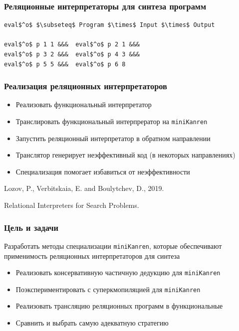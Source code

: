 \documentclass{beamer}
\newcommand{\miniKanren}{\texttt{miniKanren}}
\begin{document}
\begin{frame}[fragile]
  \frametitle{Реляционные интерпретаторы для синтеза программ}

  \begin{center}
    \begin{minipage}{6.2cm}
    \begin{lstlisting}[frame=single]
eval$^o$ $\subseteq$ Program $\times$ Input $\times$ Output

eval$^o$ p 1 1 &&&  eval$^o$ p 2 1 &&&
eval$^o$ p 3 2 &&&  eval$^o$ p 4 3 &&&
eval$^o$ p 5 5 &&&  eval$^o$ p 6 8
    \end{lstlisting}
    \end{minipage}
    \end{center}
\end{frame}


\begin{frame}[fragile]
  \frametitle{Реализация реляционных
  интерпретаторов}
  \begin{itemize}
    \item Реализовать функциональный интерпретатор
    \item Транслировать функциональный интерпрератор на \miniKanren
    \item Запустить реляционный интерпретатор в обратном направлении
  \end{itemize}

  \vfill

  \begin{itemize}
    \item Транслятор генерирует неэффективный код (в некоторых направлениях)
    \item Специализация помогает избавиться от неэффективности
  \end{itemize}

  \vfill

  \begin{center}
    Lozov, P., Verbitskaia, E. and Boulytchev, D., 2019.

    Relational Interpreters for Search Problems.
\end{center}

\end{frame}

\begin{frame}[fragile]
  \frametitle{Цель и задачи}

\begin{center}
  Разработать методы специализации \miniKanren, которые обеспечивают применимость реляционных интерпретаторов для синтеза
\end{center}

\begin{itemize}
  \item Реализовать консервативную частичную дедукцию для \miniKanren
  \item Поэкспериментировать с суперкмопиляцией для \miniKanren
  \item Реализовать трансляцию реляционных программ в функциональные
  \item Сравнить и выбрать самую адекватную стратегию
\end{itemize}
\end{frame}
\end{document}
